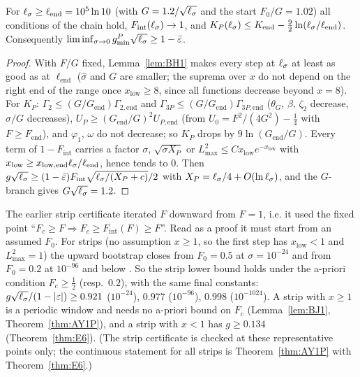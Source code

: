 \begin{lemma} \proofst
\label{lem:BH2}
For $\ell_\sigma\ge\ell_{\mathrm{end}}=10^5\ln10$ (with $G=1.2/\sqrt{\ell_\sigma}$ and the start $F_0/G=1.02$) all conditions of the chain hold, $F_{\mathrm{int}}(\ell_\sigma)\to1$, and
$K_P(\ell_\sigma)\le K_{\mathrm{end}}-\tfrac92\ln(\ell_\sigma/\ell_{\mathrm{end}})$. Consequently
$\liminf_{\sigma\to0}g_{\min}^P\sqrt{\ell_\sigma}\ge1-\bar\varepsilon$.
\end{lemma}
\begin{proof}
With $F/G$ fixed, Lemma~\ref{lem:BH1} makes every step at $\ell_\sigma$ at least as good as at $\ell_{\mathrm{end}}$ ($\hat\sigma$ and $G$ are smaller; the suprema over $x$
do not depend on the right end of the range once $x_{\mathrm{low}}\ge8$, since all functions decrease beyond $x=8$). For $K_P$: $\Gamma_2\le(G/G_{\mathrm{end}})\Gamma_{2,\mathrm{end}}$
and $\Gamma_{3P}\le(G/G_{\mathrm{end}})\Gamma_{3P,\mathrm{end}}$ ($\theta_G$, $\beta$, $\zeta_2$ decrease, $\sigma/G$ decreases), $U_P\ge(G_{\mathrm{end}}/G)^2U_{P,\mathrm{end}}$ (from
$U_0=F^2/(4G^2)-\frac14$ with $F\ge F_{\mathrm{end}}$), and $\varphi_1$, $\omega$ do not decrease; so $K_P$ drops by $9\ln(G_{\mathrm{end}}/G)$. Every term of
$1-F_{\mathrm{int}}$ carries a factor $\sigma$, $\sqrt{\sigma X_P}$ or $L^2_{\max}\le Cx_{\mathrm{low}}e^{-x_{\mathrm{low}}}$ with $x_{\mathrm{low}}\ge x_{\mathrm{low,end}}\ell_\sigma/\ell_{\mathrm{end}}$,
hence tends to $0$. Then $g\sqrt{\ell_\sigma}\ge(1-\bar\varepsilon)F_{\mathrm{int}}\sqrt{\ell_\sigma/(X_P+c)}/2$ with $X_P=\ell_\sigma/4+O(\ln\ell_\sigma)$, and the $G$-branch gives
$G\sqrt{\ell_\sigma}=1.2$.
\end{proof}

\begin{remark}
\label{rem:AY1}
The earlier strip certificate iterated $F$ downward from $F=1$, i.e. it used the fixed point ``$F_c\ge F\Rightarrow F_c\ge F_{\mathrm{int}}(F)\ge F$''. Read as a
proof it must start from an assumed $F_0$. For strips (no assumption $x\ge1$, so the first step has $x_{\mathrm{low}}<1$ and $L^2_{\max}=1$) the
upward bootstrap closes from $F_0=0.5$ at $\sigma=10^{-24}$ and from $F_0=0.2$ at $10^{-96}$ and below .
So the strip lower bound holds under the a-priori condition $F_c\ge\tfrac12$ (resp.\ $0.2$), with the same final constants:
$g\sqrt{\ell_\sigma}/(1-|\varepsilon|)\ge0.921$ ($10^{-24}$), $0.977$ ($10^{-96}$), $0.998$ ($10^{-1024}$). A strip with $x\ge1$ is a periodic window and
needs no a-priori bound on $F_c$ (Lemma~\ref{lem:BJ1}, Theorem~\ref{thm:AY1P}), and a strip with $x<1$ has $g\ge0.134$ (Theorem~\ref{thm:E6}). (The strip certificate is checked at these representative points only; the continuous
statement for all strips is Theorem~\ref{thm:AY1P} with Theorem~\ref{thm:E6}.)
\end{remark}

